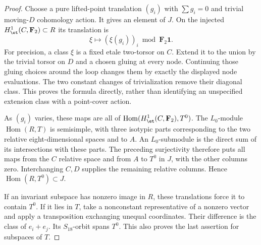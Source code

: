 \begin{proof}
Choose a pure lifted-point translation $(g_i)$ with
$\sum g_i=0$ and trivial moving-$D$ cohomology action.
It gives an element of $J$. On the injected
$H^1_{\et}(C,\mathbf F_2)\subset R$ its translation is
\[
                       \xi\longmapsto(\xi(g_i))_i
                                     \bmod\mathbf F_2\mathbf1.
\]
For precision, a class $\xi$ is a fixed etale two-torsor
on $C$. Extend it to the union by the trivial torsor on
$D$ and a chosen gluing at every node. Continuing those
gluing choices around the loop changes them by exactly
the displayed node evaluations. The two constant changes
of trivialization remove their diagonal class. This proves
the formula directly, rather than identifying an unspecified
extension class with a point-cover action.

As $(g_i)$ varies, these maps are all of
$\operatorname{Hom}(H^1_{\et}(C,\mathbf F_2),T^0)$.
The $L_0$-module $\operatorname{Hom}(R,T)$ is semisimple,
with three isotypic parts corresponding to the two
relative eight-dimensional spaces and to $A$.
An $L_0$-submodule is the direct sum of its intersections
with these parts. The preceding surjectivity therefore
puts all maps from the $C$ relative space and from $A$
to $T^0$ in $J$, with the other columns zero.
Interchanging $C,D$ supplies the remaining relative
columns. Hence $\operatorname{Hom}(R,T^0)\subset J$.

If an invariant subspace has nonzero image in $R$, these
translations force it to contain $T^0$. If it lies in
$T$, take a nonconstant representative of a nonzero
vector and apply a transposition exchanging unequal
coordinates. Their difference is the class of $e_i+e_j$.
Its $S_{18}$-orbit spans $T^0$. This also proves the last
assertion for subspaces of $T$.
\end{proof}

